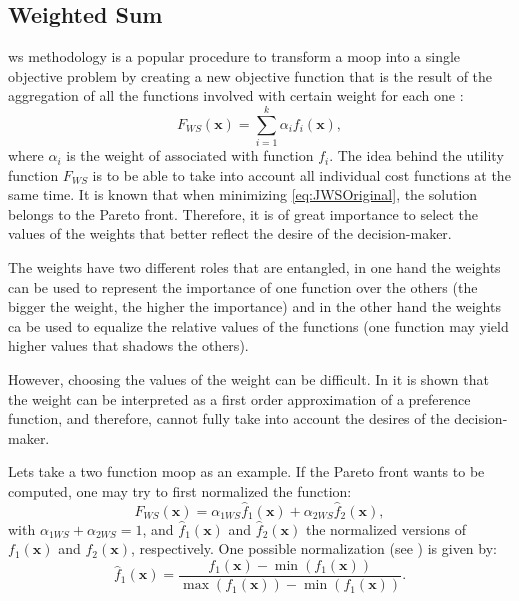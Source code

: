 \subsection{Weighted Sum}
\label{sec:WS}
\gls{ws} methodology is a popular procedure to transform a \gls{moop} into a single objective problem by creating a new objective function that is the result of the aggregation of all the functions involved with certain weight for each one \citep{Marler2004}:
%
\begin{equation}
F_{WS}(\mathbf{x}) = \sum_{i=1}^{k}\alpha_{i} {f}_{i}(\mathbf{x}),
\label{eq:JWSOriginal}
\end{equation}
%
where $\alpha_i$ is the weight of associated with function $f_i$. The idea behind the utility function $F_{WS}$ is to be able to take into account all individual cost functions at the same time. It is known that when minimizing \eqref{eq:JWSOriginal}, the solution belongs to the Pareto front. Therefore, it is of great importance to select the values of the weights that better reflect the desire of the decision-maker.

The weights have two different roles that are entangled, in one hand the weights can be used to represent the importance of one function over the others (the bigger the weight, the higher the importance) and in the other hand the weights ca be used to equalize the relative values of the functions (one function may yield higher values that shadows the others).

However, choosing the values of the weight can be difficult. In \citet{Marler2010} it is shown that the weight can be interpreted as a first order approximation of a preference function, and therefore, cannot fully take into account the desires of the decision-maker.

Lets take a two function \gls{moop} as an example. If the Pareto front wants to be computed, one may try to first normalized the function:
\begin{equation}
F_{WS}(\mathbf{x}) = \alpha_{1WS} \hat{f}_{1}(\mathbf{x}) + \alpha_{2WS} \hat{f}_{2}(\mathbf{x}),
\label{eq:JWS}
\end{equation}
with $\alpha_{1WS} + \alpha_{2WS}=1$, and $\hat{f}_{1}(\mathbf{x})$ and $\hat{f}_{2}(\mathbf{x})$ the normalized versions of $f_{1}(\mathbf{x})$ and $f_{2}(\mathbf{x})$, respectively. One possible normalization (see \citet{Marler2004}) is given by:
\begin{equation}
\hat{f}_{1}(\mathbf{x}) = \frac{f_{1}(\mathbf{x})-\min{\left( f_{1}(\mathbf{x})\right) }}{\max{(f_{1}(\mathbf{x}))}-\min{\left( f_{1}(\mathbf{x})\right) }}.
\label{eq:NormalizedJ}
\end{equation}

